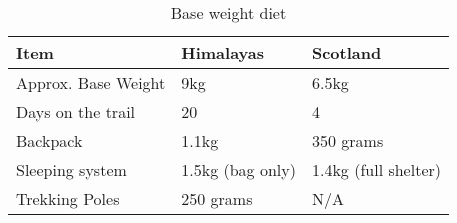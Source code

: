 \begin{table}[H]
  \centering
  \begin{tabular}{ | l | p{3cm} | p{3cm} | }
    \hline			
    \textbf{Item} & \textbf{Himalayas} & \textbf{Scotland} \\
    \hline
    Approx. Base Weight & 9kg & 6.5kg \\
    \hline
    Days on the trail & 20 & 4 \\
    \hline
    Backpack & 1.1kg & 350 grams \\
    \hline
    Sleeping system & 1.5kg \newline (bag only) & 1.4kg \newline (full shelter) \\
    \hline
    Trekking Poles & 250 grams & N/A \\
    \hline
  \end{tabular}
  \caption{Base weight diet}
\end{table}